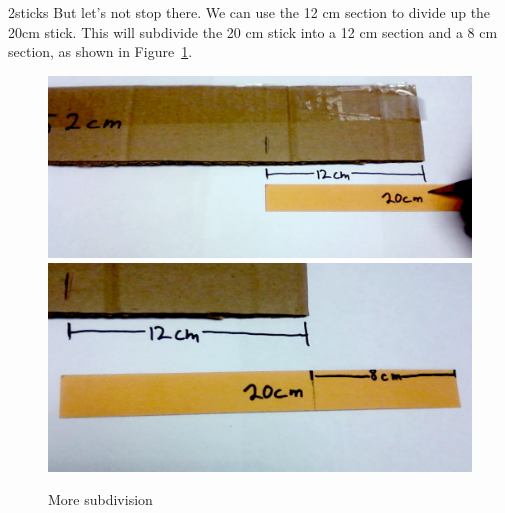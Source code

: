 \begin{example}{2sticks}
But let's not stop there. We can use the 12 cm section to divide up the 20cm stick. This will subdivide the 20 cm stick into a 12 cm section and a 8 cm section, as shown in Figure~\ref{fig:5}.
\begin{figure}
\begin{center}
	\includegraphics[width=.4900\textwidth]{images/2_sticks_step6.png} 
\includegraphics[width=.4900\textwidth]{images/2_sticks_step7.png}
\end{center}
\caption{More subdivision\label{fig:5}}
\end{figure}


\end{example}
